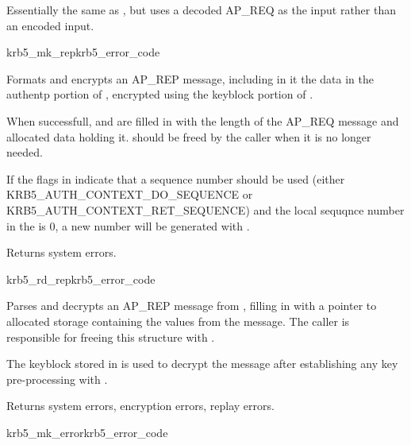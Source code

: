 Essentially the same as , but uses a decoded AP_REQ
as the input rather than an encoded input.

\begin{funcdecl}{krb5_mk_rep}{krb5_error_code}{\funcinout}
\funcout
{}
\end{funcdecl}

Formats and encrypts an AP_REP message, including in it the data in the
authentp portion of , encrypted using the
keyblock portion of . 

When successfull,  and
 are filled in with the length of the
AP_REQ message and allocated data holding it.
 should be freed by the
caller when it is no longer needed. 

If the flags in  indicate that a sequence number
should be used (either {\sc KRB5_AUTH_CONTEXT_DO_SEQUENCE} or
{\sc KRB5_AUTH_CONTEXT_RET_SEQUENCE}) and the local sequqnce number in the
 is 0, a new number will be generated with
.

Returns system errors.

\begin{funcdecl}{krb5_rd_rep}{krb5_error_code}{\funcinout}
\funcin
{}
\funcout
{}
\end{funcdecl}

Parses and decrypts an AP_REP message from , filling in
 with a pointer to  allocated storage containing the
values from the message.  The caller is responsible for freeing this
structure with .

The keyblock stored in  is used to decrypt the
message after establishing any key pre-processing with
. 

Returns system errors, encryption errors, replay errors.

\begin{funcdecl}{krb5_mk_error}{krb5_error_code}{\funcinout}
\funcin
{}
\funcout
{}
\end{funcdecl}

